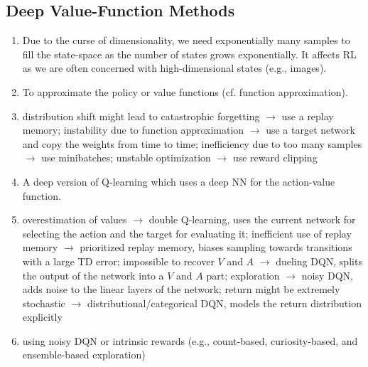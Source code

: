 		\subsection{Deep Value-Function Methods}
			\begin{enumerate}
				\item Due to the curse of dimensionality, we need exponentially many samples to fill the state-space as the number of states grows exponentially. It affects \ac{RL} as we are often concerned with high-dimensional states (e.g., images).
				\item To approximate the policy or value functions (cf. function approximation).
				\item distribution shift might lead to catastrophic forgetting \(\to\) use a replay memory; instability due to function approximation \(\to\) use a target network and copy the weights from time to time; inefficiency due to too many samples \(\to\) use minibatches; unstable optimization \(\to\) use reward clipping
				\item A deep version of Q-learning which uses a deep \ac{NN} for the action-value function.
				\item overestimation of values \(\to\) double Q-learning, uses the current network for selecting the action and the target for evaluating it; inefficient use of replay memory \(\to\) prioritized replay memory, biases sampling towards transitions with a large \ac{TD} error; impossible to recover \(V\) and \(A\) \(\to\) dueling \ac{DQN}, splits the output of the network into a \(V\) and \(A\) part; exploration \(\to\) noisy \ac{DQN}, adds noise to the linear layers of the network; return might be extremely stochastic \(\to\) distributional/categorical \ac{DQN}, models the return distribution explicitly
				\item using noisy \ac{DQN} or intrinsic rewards (e.g., count-based, curiosity-based, and ensemble-based exploration)
			\end{enumerate}

